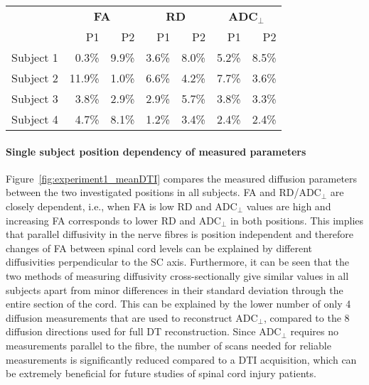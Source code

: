 \begin{table}
	\centering
    \begin{tabular}{lrrrrrr}
		\toprule
		& \multicolumn{2}{c}{\textbf{FA}} & \multicolumn{2}{c}{\textbf{RD}} & \multicolumn{2}{c}{\textbf{ADC$_\perp$}}\\
  		& P1 & P2 & P1 & P2 & P1 & P2 \\
  		\cmidrule(r){2-3}\cmidrule(lr){4-5}\cmidrule(l){6-7}
  		Subject 1 & 0.3\% & 9.9\%  & 3.6\% & 8.0\% & 5.2\% & 8.5\%\\
  		Subject 2 & 11.9\% & 1.0\% & 6.6\% & 4.2\% & 7.7\% & 3.6\%\\
  		Subject 3 & 3.8\% & 2.9\%  & 2.9\% & 5.7\% & 3.8\% & 3.3\%\\
  		Subject 4 & 4.7\% & 8.1\%  & 1.2\% & 3.4\% & 2.4\% & 2.4\%\\
		\bottomrule
  \end{tabular}      
\label{tab:exp1_reproducibility}
\end{table}

\paragraph{Single subject position dependency of measured parameters} Figure~\ref{fig:experiment1_meanDTI} compares the measured diffusion parameters between the two investigated positions in all subjects. FA and RD/ADC$_\perp$ are closely dependent, i.e., when FA is low RD and ADC$_\perp$ values are high and increasing FA corresponds to lower RD and ADC$_\perp$ in both positions. This implies that parallel diffusivity in the nerve fibres is position independent and therefore changes of FA between spinal cord levels can be explained by different diffusivities perpendicular to the SC axis. Furthermore, it can be seen that the two methods of measuring diffusivity cross-sectionally give similar values in all subjects apart from minor differences in their standard deviation through the entire section of the cord. This can be explained by the lower number of only 4 diffusion measurements that are used to reconstruct ADC$_\perp$, compared to the 8 diffusion directions used for full DT reconstruction. Since ADC$_\perp$ requires no measurements parallel to the fibre, the number of scans needed for reliable measurements is significantly reduced compared to a DTI acquisition, which can be extremely beneficial for future studies of spinal cord injury patients. 

